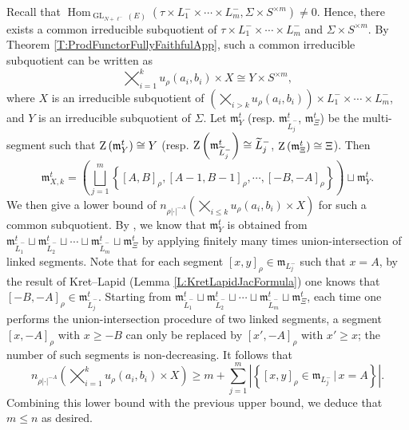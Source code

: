 \documentclass[11pt,letterpaper]{amsart}
\theoremstyle{plain}
\numberwithin{theorem}{section}
\numberwithin{equation}{subsection}
\theoremstyle{remark}
\newcommand{\Hom}{\operatorname{Hom}}
\newcommand{\GL}{\operatorname{GL}}
\begin{document}
Recall that $\Hom_{\GL_{N+\ell^-}\left(E\right)}\left(\tau\times L^-_1\times\cdots\times L^-_m, \Sigma\times S^{\times m}\right)\neq0$. Hence, there exists a common irreducible subquotient of $\tau\times L^-_1\times\cdots\times L^-_m$ and $\Sigma\times S^{\times m}$. By Theorem \ref{T:ProdFunctorFullyFaithfulApp}, such a common irreducible subquotient can be written as
\[
    \bigtimes_{i=1}^k u_\rho\left(a_i,b_i\right)\times X \cong Y \times S^{\times m},
\]
where $X$ is an irreducible subquotient of $\left(\bigtimes_{i>k} u_\rho\left(a_i,b_i\right)\right)\times L^-_1\times\cdots\times L^-_m$, and $Y$ is an irreducible subquotient of $\Sigma$. Let $\mathfrak{m}^t_{Y}$ (resp. $\mathfrak{m}^t_{\widetilde{L}^-_j}$, $\mathfrak{m}^t_{\Xi}$) be the multi-segment such that ${\rm Z}\left(\mathfrak{m}^t_Y\right)\cong Y$ (resp. ${\rm Z}\left(\mathfrak{m}^t_{\widetilde{L}^-_j}\right)\cong \widetilde{L}^-_j$, ${\rm Z}\left(\mathfrak{m}^t_{\Xi}\right)\cong \Xi$). 
Then
\[
    \mathfrak{m}_{X,k}^t = \left(\bigsqcup_{j=1}^m \left\{\left[A,B\right]_\rho,\left[A-1,B-1\right]_\rho,\cdots,\left[-B,-A\right]_\rho\right\}\right) \sqcup \mathfrak{m}_Y^t.
\]
We then give a lower bound of $n_{\rho|\cdot|^{-A}}\left(\bigtimes_{i\leq k} u_\rho\left(a_i,b_i\right)\times X\right)$ for such a common subquotient. By \cite[Thm. 7.1]{ZeleII}, we know that $\mathfrak{m}_{Y}^t$ is obtained from $\mathfrak{m}^t_{\widetilde{L}^-_1}\sqcup\mathfrak{m}^t_{\widetilde{L}^-_2}\sqcup\cdots\sqcup\mathfrak{m}^t_{\widetilde{L}^-_m}\sqcup\mathfrak{m}^t_{\Xi}$ by applying finitely many times union-intersection of linked segments. Note that for each segment $\left[x,y\right]_\rho\in\mathfrak{m}_{L^-_j}$ such that $x=A$, by the result of Kret--Lapid (Lemma \ref{L:KretLapidJacFormula}) one knows that $\left[-B,-A\right]_\rho\in\mathfrak{m}^t_{\widetilde{L}^-_j}$. Starting from $\mathfrak{m}^t_{\widetilde{L}^-_1}\sqcup\mathfrak{m}^t_{\widetilde{L}^-_2}\sqcup\cdots\sqcup\mathfrak{m}^t_{\widetilde{L}^-_m}\sqcup\mathfrak{m}^t_{\Xi}$, each time one performs the union-intersection procedure of two linked segments, a segment $\left[x,-A\right]_\rho$ with $x\geq -B$ can only be replaced by $\left[x',-A\right]_\rho$ with $x'\geq x$; the number of such segments is non-decreasing. It follows that
\[
    n_{\rho|\cdot|^{-A}}\left(\bigtimes_{i=1}^k u_\rho\left(a_i,b_i\right)\times X\right) \geq  m + \sum_{j=1}^m\left|\left\{\left[x,y\right]_\rho\in\mathfrak{m}_{L^-_j}\,\big|\,x=A\right\}\right|.
\]
Combining this lower bound with the previous upper bound, we deduce that $m\leq n$ as desired.
\end{document}
